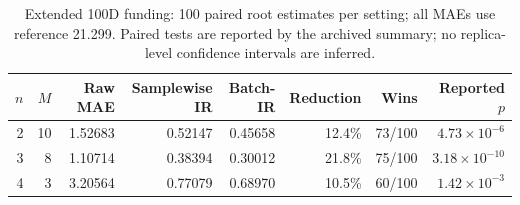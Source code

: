 \begin{table}[htbp]
\centering\small
\caption{Extended 100D funding: 100 paired root estimates per setting; all MAEs use reference 21.299. Paired tests are reported by the archived summary; no replica-level confidence intervals are inferred.}\label{tab:extended-funding}
\begin{tabular}{@{}rrrrrrrr@{}}
\toprule
$n$ & $M$ & Raw MAE & Samplewise IR & Batch-IR & Reduction & Wins & Reported $p$\\
\midrule
2 & 10 & 1.52683 & 0.52147 & 0.45658 & 12.4\% & 73/100 & $4.73\times10^{-6}$\\
3 & 8 & 1.10714 & 0.38394 & 0.30012 & 21.8\% & 75/100 & $3.18\times10^{-10}$\\
4 & 3 & 3.20564 & 0.77079 & 0.68970 & 10.5\% & 60/100 & $1.42\times10^{-3}$\\
\bottomrule
\end{tabular}
\end{table}
